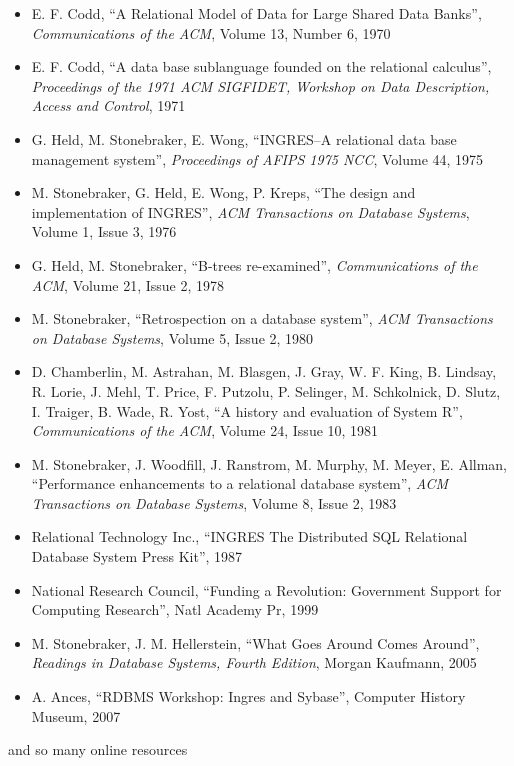 \begin{itemize}
 \item E. F. Codd, ``A Relational Model of Data for Large Shared Data
       Banks'', {\it Communications of the ACM}, Volume 13, Number 6,
       1970
 \item E. F. Codd, ``A data base sublanguage founded on the relational
       calculus'', {\it Proceedings of the 1971 ACM SIGFIDET, Workshop on Data Description, Access and Control}, 1971
 \item G. Held, M. Stonebraker, E. Wong, ``INGRES--A relational data
       base management system'', {\it Proceedings of AFIPS 1975 NCC},
       Volume 44, 1975
 \item M. Stonebraker, G. Held, E. Wong, P. Kreps, ``The design and
       implementation of INGRES'', {\it ACM Transactions on Database
       Systems}, Volume 1, Issue 3, 1976
 \item G. Held, M. Stonebraker, ``B-trees re-examined'', {\it Communications of the
       ACM}, Volume 21, Issue 2, 1978
 \item M. Stonebraker, ``Retrospection on a database system'', {\it ACM
       Transactions on Database Systems}, Volume 5, Issue 2, 1980
 \item D. Chamberlin, M. Astrahan, M. Blasgen, J. Gray, W. F. King,
       B. Lindsay, R. Lorie, J. Mehl, T. Price, F. Putzolu, P. Selinger,
       M. Schkolnick, D. Slutz, I. Traiger, B. Wade, R. Yost, ``A
       history and evaluation of System R'', {\it Communications of the
       ACM}, Volume 24, Issue 10, 1981
 \item M. Stonebraker, J. Woodfill, J. Ranstrom, M. Murphy, M. Meyer,
       E. Allman, ``Performance enhancements to a relational database
       system'', {\it ACM Transactions on Database Systems}, Volume 8,
       Issue 2, 1983
 \item Relational Technology Inc., ``INGRES The Distributed SQL
       Relational Database System Press Kit'', 1987
 \item National Research Council, ``Funding a Revolution: Government
       Support for Computing Research'', Natl Academy Pr, 1999
 \item M. Stonebraker, J. M. Hellerstein, ``What Goes Around Comes
       Around'', {\it Readings in Database Systems, Fourth Edition},
       Morgan Kaufmann, 2005
 \item A. Ances, ``RDBMS Workshop: Ingres and Sybase'', Computer
       History Museum, 2007
\end{itemize}

and so many online resources

\normalsize